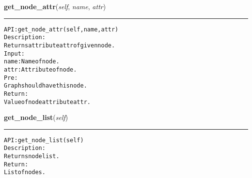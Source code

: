     \vspace{0.5ex}

\hspace{.8\funcindent}\begin{boxedminipage}{\funcwidth}

    \raggedright \textbf{get\_node\_attr}(\textit{self}, \textit{name}, \textit{attr})

    \vspace{-1.5ex}

    \rule{\textwidth}{0.5\fboxrule}
\setlength{\parskip}{2ex}
\begin{alltt}

API: get\_node\_attr(self, name, attr)
Description:
Returns attribute attr of given node.
Input:
    name: Name of node.
    attr: Attribute of node.
Pre:
    Graph should have this node.
Return:
    Value of node attribute attr.
\end{alltt}

\setlength{\parskip}{1ex}
    \end{boxedminipage}

    \label{coinor:gimpy:graph:Graph:get_node_list}

    \vspace{0.5ex}

\hspace{.8\funcindent}\begin{boxedminipage}{\funcwidth}

    \raggedright \textbf{get\_node\_list}(\textit{self})

    \vspace{-1.5ex}

    \rule{\textwidth}{0.5\fboxrule}
\setlength{\parskip}{2ex}
\begin{alltt}

API: get\_node\_list(self)
Description:
Returns node list.
Return:
    List of nodes.
\end{alltt}

\setlength{\parskip}{1ex}
    \end{boxedminipage}

    \label{coinor:gimpy:graph:Graph:get_node_num}

